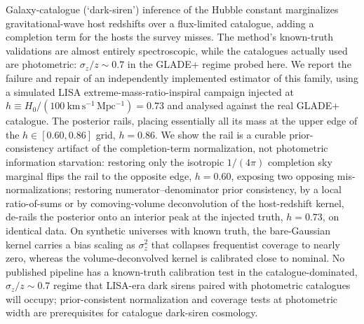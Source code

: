 Galaxy-catalogue (`dark-siren') inference of the Hubble constant
marginalizes gravitational-wave host redshifts over a flux-limited
catalogue, adding a completion term for the hosts the survey misses.
The method's known-truth validations are almost entirely
spectroscopic, while the catalogues actually used are photometric:
$\sigma_z/z \sim 0.7$ in the GLADE+ regime probed here. %
We report the failure and repair of an independently implemented
estimator of this family, using a simulated LISA
extreme-mass-ratio-inspiral campaign injected at
$h \equiv H_0/(100~\mathrm{km\,s^{-1}\,Mpc^{-1}}) = 0.73$ %
and analysed against the real GLADE+ catalogue.  The posterior rails,
placing essentially all its mass at the upper edge of the
$h \in [0.60, 0.86]$ grid, $h = 0.86$. %
We show the rail is a curable prior-consistency artifact of the
completion-term normalization, not photometric information starvation:
restoring only the isotropic $1/(4\pi)$ completion sky marginal flips
the rail to the opposite edge, $h = 0.60$, exposing two opposing
mis-normalizations; %
restoring numerator--denominator prior consistency, by a local
ratio-of-sums or by comoving-volume deconvolution of the host-redshift
kernel, de-rails the posterior onto an interior peak at the injected
truth, $h = 0.73$, on identical data. %
On synthetic universes with known truth, the bare-Gaussian kernel
carries a bias scaling as $\sigma_z^2$ that collapses frequentist
coverage to nearly zero, whereas the volume-deconvolved kernel is
calibrated close to nominal. %
No published pipeline has a known-truth calibration test in the
catalogue-dominated, $\sigma_z/z \sim 0.7$ regime %
that LISA-era dark sirens paired with photometric catalogues will
occupy; prior-consistent normalization and coverage tests at
photometric width are prerequisites for catalogue dark-siren
cosmology.

